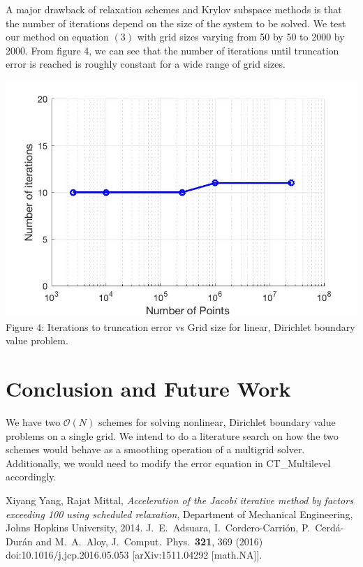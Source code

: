 \documentclass[12pt]{article}
\begin{document}
\begin{multicols}{2}
A major drawback of relaxation schemes and Krylov subspace methods is that the number of iterations depend on the size of the system to be solved. We test our method on equation $(3)$ with grid sizes varying from 50 by 50 to 2000 by 2000. From figure 4, we can see that the number of iterations until truncation error is reached is roughly constant for a wide range of grid sizes.

\begin{center}
    \includegraphics[scale=0.3]{iterations.jpg} \\
    \small{Figure 4: Iterations to truncation error vs Grid size for linear, Dirichlet boundary value problem.}
\end{center}

\section{Conclusion and Future Work}
We have two $\mathcal{O}(N)$ schemes for solving nonlinear, Dirichlet boundary value problems on a single grid. We intend to do a literature search on how the two schemes would behave as a smoothing operation of a multigrid solver. Additionally, we would need to modify the error equation in CT\_Multilevel accordingly.

\begin{thebibliography}{9}


  Xiyang Yang, Rajat Mittal,
  \textit{Acceleration of the Jacobi iterative method by factors exceeding 100 using scheduled relaxation},
  Department of Mechanical Engineering, Johns Hopkins University,
  2014.
  J.~E.~Adsuara, I.~Cordero-Carrión, P.~Cerdá-Durán and M.~A.~Aloy,
  J.\ Comput.\ Phys.\  {\bf 321}, 369 (2016)
  doi:10.1016/j.jcp.2016.05.053
  [arXiv:1511.04292 [math.NA]].

\end{thebibliography}

\end{multicols}
\end{document}
